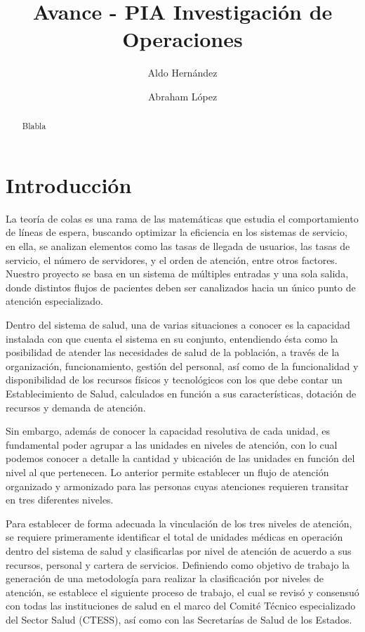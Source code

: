 \documentclass[10pt]{article}
\begin{document}
	\begin{opening}
		\title{Avance - PIA Investigación de Operaciones}
		\author[Universidad Autónoma de Nuevo León, San Nicolás de los Garza, aldo.hernandezt@uanl.edu.mx]{Aldo Hernández}
		\author[Universidad Autónoma de Nuevo León, San Nicolás de los Garza, abraham.lopezg@uanl.edu.mx]{Abraham López}
		
		\begin{abstract}
            Blabla
		\end{abstract}

	\end{opening}
	
	\section{Introducción}
	La teoría de colas es una rama de las matemáticas que estudia el comportamiento de líneas de espera, buscando optimizar la eficiencia en los sistemas de servicio, en ella, se analizan elementos como las tasas de llegada de usuarios, las tasas de servicio, el número de servidores, y el orden de atención, entre otros factores. Nuestro proyecto se basa en un sistema de múltiples entradas y una sola salida, donde distintos flujos de pacientes deben ser canalizados hacia un único punto de atención especializado. \par
    Dentro del sistema de salud, una de varias situaciones a conocer es la capacidad instalada con que cuenta el sistema en su conjunto, entendiendo ésta como la posibilidad de atender las necesidades de salud de la población, a través de la organización, funcionamiento, gestión del personal, así como de la funcionalidad y disponibilidad de los recursos físicos y tecnológicos con los que debe contar un Establecimiento de Salud, calculados en función a sus características, dotación de recursos y demanda de atención. \par
    Sin embargo, además de conocer la capacidad resolutiva de cada unidad, es fundamental poder agrupar a las unidades en niveles de atención, con lo cual podemos conocer a detalle la cantidad y ubicación de las unidades en función del nivel al que pertenecen. Lo anterior permite establecer un flujo de atención organizado y armonizado para las personas cuyas atenciones requieren transitar en tres diferentes niveles. \par
    Para establecer de forma adecuada la vinculación de los tres niveles de atención, se requiere primeramente identificar el total de unidades médicas en operación dentro del sistema de salud y clasificarlas por nivel de atención de acuerdo a sus recursos, personal y cartera de servicios. Definiendo como objetivo de trabajo la generación de una metodología para realizar la clasificación por niveles de atención, se establece el siguiente proceso de trabajo, el cual se revisó y consensuó con todas las instituciones de salud en el marco del Comité Técnico especializado del Sector Salud (CTESS), así como con las Secretarías de Salud de los Estados. \par
\end{document}
